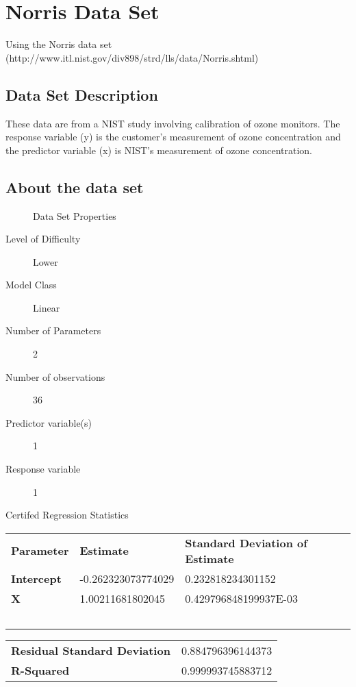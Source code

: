 \documentclass[10pt]{article}
\begin{document}
\section{Norris Data Set}
Using the Norris data set (http://www.itl.nist.gov/div898/strd/lls/data/Norris.shtml)
\subsection*{Data Set Description}

These data are from a NIST study involving calibration of ozone monitors. The 
response variable (y) is the customer's measurement of ozone concentration and 
the predictor variable (x) is NIST's measurement of ozone concentration.  

\subsection*{About the data set}

\begin{description}
   \item[]Data Set Properties
   \item[Level of Difficulty] Lower
   \item[Model Class] Linear
   \item[Number of Parameters] 2   
   \item[Number of observations] 36
   \item[Predictor variable(s)] 1
   \item[Response variable] 1
\end{description}

Certifed Regression Statistics

\begin{tabular}{lll}
   \textbf{Parameter} & \textbf{Estimate} & \textbf{Standard Deviation of Estimate}  \\ 
	\textbf{Intercept} & -0.262323073774029 &  0.232818234301152\\ 
	\textbf{X} & 1.00211681802045  &  0.429796848199937E-03 \\ 
	\ 
\end{tabular} 

\begin{tabular}{ll}
    \textbf{Residual Standard Deviation} &  0.884796396144373  \\ 
	 \textbf{R-Squared} & 0.999993745883712    \\  
\end{tabular}
\end{document}
